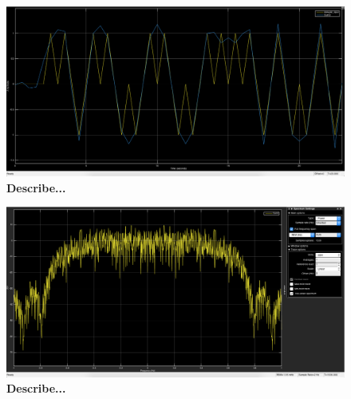 \documentclass[letterpaper,12pt]{article}
\begin{document}
\begin{figure}[hbtp]
\includegraphics[width=1.0\columnwidth]{prelab1-filter-input-output}
\caption{
\label{fig:prelab1-filter-input-output}
{\bf Describe...
}
}
\end{figure}

\begin{figure}[hbtp]
\includegraphics[width=1.0\columnwidth]{prelab1-filter-output-spectrum}
\caption{
\label{fig:prelab1-filter-output-spectrum}
{\bf Describe...
}
}
\end{figure}
\end{document}
